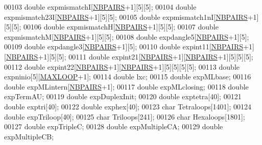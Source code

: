 \begin{DoxyCode}
00103   \textcolor{keywordtype}{double}  expmismatchI[\hyperlink{energy__const_8h_a5e75221c779d618eab81e096f37e32ce}{NBPAIRS}+1][5][5];
00104   \textcolor{keywordtype}{double}  expmismatch23I[\hyperlink{energy__const_8h_a5e75221c779d618eab81e096f37e32ce}{NBPAIRS}+1][5][5];
00105   \textcolor{keywordtype}{double}  expmismatch1nI[\hyperlink{energy__const_8h_a5e75221c779d618eab81e096f37e32ce}{NBPAIRS}+1][5][5];
00106   \textcolor{keywordtype}{double}  expmismatchH[\hyperlink{energy__const_8h_a5e75221c779d618eab81e096f37e32ce}{NBPAIRS}+1][5][5];
00107   \textcolor{keywordtype}{double}  expmismatchM[\hyperlink{energy__const_8h_a5e75221c779d618eab81e096f37e32ce}{NBPAIRS}+1][5][5];
00108   \textcolor{keywordtype}{double}  expdangle5[\hyperlink{energy__const_8h_a5e75221c779d618eab81e096f37e32ce}{NBPAIRS}+1][5];
00109   \textcolor{keywordtype}{double}  expdangle3[\hyperlink{energy__const_8h_a5e75221c779d618eab81e096f37e32ce}{NBPAIRS}+1][5];
00110   \textcolor{keywordtype}{double}  expint11[\hyperlink{energy__const_8h_a5e75221c779d618eab81e096f37e32ce}{NBPAIRS}+1][\hyperlink{energy__const_8h_a5e75221c779d618eab81e096f37e32ce}{NBPAIRS}+1][5][5];
00111   \textcolor{keywordtype}{double}  expint21[\hyperlink{energy__const_8h_a5e75221c779d618eab81e096f37e32ce}{NBPAIRS}+1][\hyperlink{energy__const_8h_a5e75221c779d618eab81e096f37e32ce}{NBPAIRS}+1][5][5][5];
00112   \textcolor{keywordtype}{double}  expint22[\hyperlink{energy__const_8h_a5e75221c779d618eab81e096f37e32ce}{NBPAIRS}+1][\hyperlink{energy__const_8h_a5e75221c779d618eab81e096f37e32ce}{NBPAIRS}+1][5][5][5][5];
00113   \textcolor{keywordtype}{double}  expninio[5][\hyperlink{energy__const_8h_ad1bd6eabac419670ddd3c9ed82145988}{MAXLOOP}+1];
00114   \textcolor{keywordtype}{double}  lxc;
00115   \textcolor{keywordtype}{double}  expMLbase;
00116   \textcolor{keywordtype}{double}  expMLintern[\hyperlink{energy__const_8h_a5e75221c779d618eab81e096f37e32ce}{NBPAIRS}+1];
00117   \textcolor{keywordtype}{double}  expMLclosing;
00118   \textcolor{keywordtype}{double}  expTermAU;
00119   \textcolor{keywordtype}{double}  expDuplexInit;
00120   \textcolor{keywordtype}{double}  exptetra[40];
00121   \textcolor{keywordtype}{double}  exptri[40];
00122   \textcolor{keywordtype}{double}  exphex[40];
00123   \textcolor{keywordtype}{char}    Tetraloops[1401];
00124   \textcolor{keywordtype}{double}  expTriloop[40];
00125   \textcolor{keywordtype}{char}    Triloops[241];
00126   \textcolor{keywordtype}{char}    Hexaloops[1801];
00127   \textcolor{keywordtype}{double}  expTripleC;
00128   \textcolor{keywordtype}{double}  expMultipleCA;
00129   \textcolor{keywordtype}{double}  expMultipleCB;

\end{DoxyCode}
